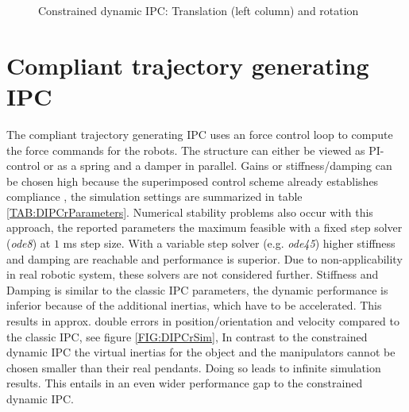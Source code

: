 \documentclass[a4paper,twoside, openright,12pt]{report}
\begin{document}
\begin{figure}

\label{FIG:DIPCcSim}
\caption[Simulation results of the constrained dynamic IPC]{Constrained dynamic IPC: Translation (left column) and rotation}
\end{figure}

\section{Compliant trajectory generating IPC}
The compliant trajectory generating IPC uses an force control loop to compute the force commands for the robots. The structure can either be viewed as PI-control or as a spring and a damper in parallel. Gains or stiffness/damping can be chosen high because the superimposed control scheme already establishes compliance \cite{Caccavale_08}, the simulation settings are summarized in table \ref{TAB:DIPCrParameters}. Numerical stability problems also occur with this approach, the reported parameters   the maximum feasible with a fixed step solver (\emph{ode8}) at $1$ ms step size. With a variable step solver (e.g. \emph{ode45}) higher stiffness and damping are reachable and performance is superior. Due to non-applicability in real robotic system, these solvers are not considered further. Stiffness and Damping is similar to the classic IPC parameters, the dynamic performance is inferior because of the additional inertias, which have to be accelerated. This results in approx. double errors in position/orientation and velocity compared to the classic IPC, see figure \ref{FIG:DIPCrSim}, In contrast to the constrained dynamic IPC the virtual inertias for the object and the manipulators cannot be chosen smaller than their real pendants. Doing so leads to infinite simulation results. This entails in an even wider performance gap to the constrained dynamic IPC.
\end{document}
